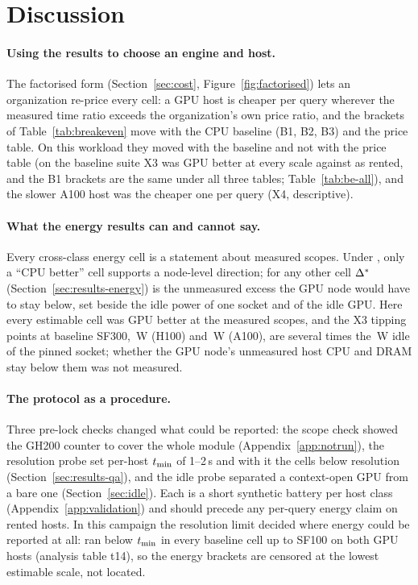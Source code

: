 \documentclass[sigconf]{acmart}
\begin{document}
\section{Discussion}
\label{sec:discussion}
\paragraph{Using the results to choose an engine and host.} The factorised form (Section~\ref{sec:cost},
Figure~\ref{fig:factorised}) lets an organization re-price every cell: a GPU host is cheaper per query
wherever the measured time ratio exceeds the organization's own price ratio, and the brackets of
Table~\ref{tab:breakeven} move with the CPU baseline (B1, B2, B3) and the price table. On this workload they moved with the baseline and not with the
price table (on the baseline suite X3 was GPU better at every scale against \CG{} as rented, and the B1
brackets are the same under all three tables; Table~\ref{tab:be-all}), and the slower A100 host was the
cheaper one per query (X4, descriptive).

\paragraph{What the energy results can and cannot say.} Every cross-class energy cell is a statement
about measured scopes. Under \NOne, only a ``CPU better'' cell supports a node-level direction; for any
other cell $\Delta^{*}$ (Section~\ref{sec:results-energy}) is the unmeasured excess the GPU node would have to
stay below, set beside the idle power of one \CG{} socket and of the idle GPU. Here every estimable cell
was GPU better at the measured scopes, and the X3 tipping points at baseline SF300,
\,W (H100) and
\,W (A100), are several
times the \,W idle of the pinned socket; whether the GPU
node's unmeasured host CPU and DRAM stay below them was not measured.

\paragraph{The protocol as a procedure.} Three pre-lock checks changed what could be reported: the
scope check showed the GH200 counter to cover the whole module (Appendix~\ref{app:notrun}), the
resolution probe set per-host $t_{\min}$ of 1--2\,s and with it the cells below resolution
(Section~\ref{sec:results-qa}), and the idle probe separated a context-open GPU from a bare one
(Section~\ref{sec:idle}). Each is a short synthetic battery per host class (Appendix~\ref{app:validation})
and should precede any per-query energy claim on rented hosts. In this campaign the resolution limit
decided where energy could be reported at all: \polarsgpu{} ran below $t_{\min}$ in every baseline cell up to
SF100 on both GPU hosts (analysis table t14), so the energy brackets are censored at the lowest estimable
scale, not located.
\end{document}
